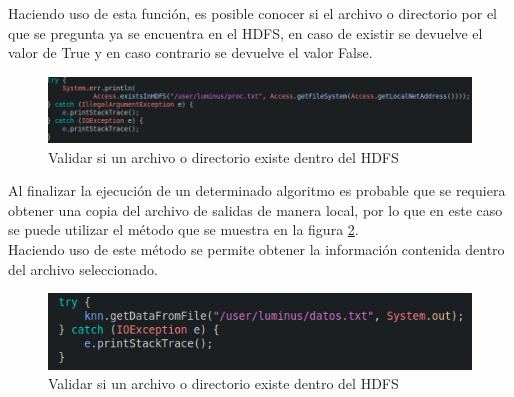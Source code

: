 Haciendo uso de esta función, es posible conocer si el archivo o directorio por el que se pregunta ya se encuentra en el HDFS, en caso de existir se devuelve el valor de True y en caso contrario se devuelve el valor False.
\begin{figure}[H]
	\begin{center}
		\hypertarget{fig:def5}{\hspace{1pt}}
		\includegraphics[width=.8\textwidth]{capitulo4b/images/exists.png}
		\caption{Validar si un archivo o directorio existe dentro del HDFS}
		\label{fig:def5}
	\end{center}
\end{figure}
Al finalizar la ejecución de un determinado algoritmo es probable que se requiera obtener una copia del archivo de salidas de manera local, por lo que en este caso se puede utilizar el método que se muestra en la figura \ref{fig:def6}.
\\
Haciendo uso de este método se permite obtener la información contenida dentro del archivo seleccionado.
\begin{figure}[H]
	\begin{center}
		\hypertarget{fig:def6}{\hspace{1pt}}
		\includegraphics[width=.8\textwidth]{capitulo4b/images/getDataFromFile.png}
		\caption{Validar si un archivo o directorio existe dentro del HDFS}
		\label{fig:def6}
	\end{center}
\end{figure}
